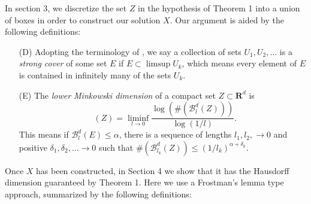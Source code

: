 \documentclass[dvipsnames]{article}
\theoremstyle{plain}
\theoremstyle{plain}
\DeclareMathOperator{\lhdim}{\underline{\dim}_{\mathbf{M}}}
\begin{document}
In section 3, we discretize the set $Z$ in the hypothesis of Theorem 1 into a union of boxes in order to construct our solution $X$. Our argument is aided by the following definitions:

\begin{enumerate}
	\item[(D)] Adopting the terminology of \cite{KatzTao}, we say a collection of sets $U_1, U_2, \dots$ is a {\it strong cover} of some set $E$ if $E \subset \limsup U_k$, which means every element of $E$ is contained in infinitely many of the sets $U_k$.

	\item[(E)] The {\it lower Minkowski dimension} of a compact set $Z \subset \mathbf{R}^d$ is
	\begin{equation} \label{lowerminkdim}
		\lhdim(Z) = \liminf_{l \to 0} \frac{\log( \#( \mathcal{B}^d_l(Z) ) )}{\log(1/l)}.
	\end{equation}
	This means if $\mathcal{B}^d_l(E) \leq \alpha$, there is a sequence of lengths $l_1, l_2, \to 0$ and positive $\delta_1, \delta_2, \dots \to 0$ such that $\#(\mathcal{B}^d_{l_k}(Z)) \leq (1/l_k)^{\alpha + \delta_k}$.
\end{enumerate}

Once $X$ has been constructed, in Section 4 we show that it has the Hausdorff dimension guaranteed by Theorem 1. Here we use a Frostman's lemma type approach, summarized by the following definitions:
\end{document}
